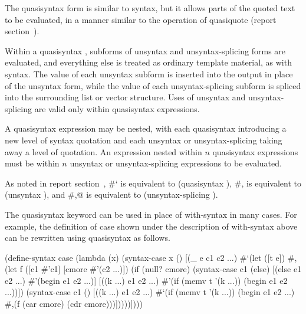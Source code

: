 \begin{entry}{%
}

The {\cf quasisyntax} form is similar to {\cf syntax}, but it allows parts
of the quoted text to be evaluated, in a manner similar to the operation
of {\cf quasiquote} (report section~).

Within a {\cf quasisyntax} , subforms of
{\cf unsyntax} and {\cf unsyntax-splicing} forms are evaluated,
and everything else is treated as ordinary template material, as
with {\cf syntax}.
The value of each {\cf unsyntax} subform is inserted into the output
in place of the {\cf unsyntax} form, while the value of each
{\cf unsyntax-splicing} subform is spliced into the surrounding list
or vector structure.
Uses of {\cf unsyntax} and {\cf unsyntax-splicing} are valid only within
{\cf quasisyntax} expressions.

A {\cf quasisyntax} expression may be nested, with each {\cf quasisyntax}
introducing a new level of syntax quotation and each {\cf unsyntax} or
{\cf unsyntax-splicing} taking away a level of quotation.
An expression nested within $n$ {\cf quasisyntax} expressions must
be within $n$ {\cf unsyntax} or {\cf unsyntax-splicing} expressions to
be evaluated.

As noted in report section~,
{\cf \#`} is equivalent to {\cf (quasisyntax
  )}, {\cf \#,} is equivalent to {\cf (unsyntax
  )}, and {\cf \#,@} is equivalent to {\cf (unsyntax-splicing
  )}.

The {\cf quasisyntax} keyword can be used in place of {\cf with-syntax} in many
cases.
For example, the definition of {\cf case} shown under the description
of {\cf with-syntax} above can be rewritten using {\cf quasisyntax}
as follows.

\begin{schemenoindent}
(define-syntax case
  (lambda (x)
    (syntax-case x ()
      [(\_ e c1 c2 ...)
       \#`(let ([t e])
           \#,(let f ([c1 \#'c1] [cmore \#'(c2 ...)])
               (if (null? cmore)
                   (syntax-case c1 (else)
                     [(else e1 e2 ...)
                      \#'(begin e1 e2 ...)]
                     [((k ...) e1 e2 ...)
                      \#'(if (memv t '(k ...))
                            (begin e1 e2 ...))])
                   (syntax-case c1 ()
                     [((k ...) e1 e2 ...)
                      \#`(if (memv t '(k ...))
                            (begin e1 e2 ...)
                            \#,(f (car cmore)
                                  (cdr cmore)))]))))])))
\end{schemenoindent}
                          

\end{entry}
